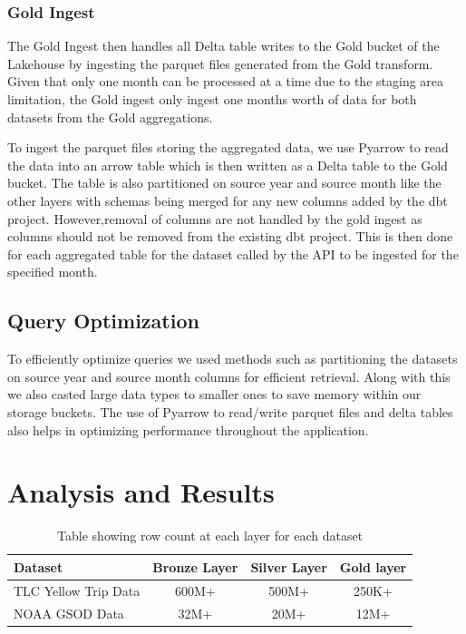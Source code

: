 \documentclass[conference]{IEEEtran}
\begin{document}
\subsubsection{Gold Ingest}

The Gold Ingest then handles all Delta table writes to the Gold bucket of the Lakehouse by ingesting the parquet files generated from the Gold transform. Given that only one month can be processed at a time due to the staging area limitation, the Gold ingest only ingest one months worth of data for both datasets from the Gold aggregations.

To ingest the parquet files storing the aggregated data, we use Pyarrow to read the data into an arrow table which is then written as a Delta table to the Gold bucket. The table is also partitioned on source year and source month like the other layers with schemas being merged for any new columns added by the dbt project. However,removal of columns are not handled by the gold ingest as columns should not be removed from the existing dbt project. This is then done for each aggregated table for the dataset called by the API to be ingested for the specified month.

\subsection{Query Optimization}
To efficiently optimize queries we used methods such as partitioning the datasets on source year and source month columns for efficient retrieval. Along with this we also casted large data types to smaller ones to save memory within our storage buckets. The use of Pyarrow to read/write parquet files and delta tables also helps in optimizing performance throughout the application.

\section{Analysis and Results}
\label{sec:results}

\begin{table}[h]
    \centering
    \caption{Table showing row count at each layer for each dataset}
    \label{tab:rowcounts}
    \begin{tabular}{|l|c|c|c|}
        \hline
        \textbf{Dataset} & \textbf{Bronze Layer} & \textbf{Silver Layer}  & \textbf{Gold layer} \\
        \hline
        TLC Yellow Trip Data & 600M+ & 500M+ & 250K+ \\
        NOAA GSOD Data & 32M+ & 20M+ & 12M+ \\
        \hline
    \end{tabular}
\end{table}
\end{document}
